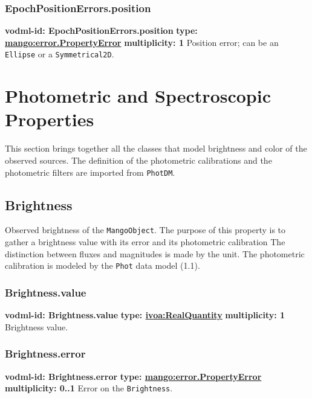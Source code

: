     \subsubsection{EpochPositionErrors.position}
    \textbf{vodml-id: EpochPositionErrors.position} \newline
    \textbf{type: \hyperref[sect:error.PropertyError]{mango:error.PropertyError}} \newline
    \textbf{multiplicity: 1} \newline
    Position error; can be an \texttt{Ellipse} or a \texttt{Symmetrical2D}.

\section{Photometric and Spectroscopic Properties}
This section brings together all the classes that model
brightness and color of the observed sources.
The definition of the photometric calibrations and the 
photometric filters are imported from \texttt{PhotDM}. 
  \subsection{Brightness}
    \label{sect:Brightness}
    Observed brightness of the \texttt{MangoObject}. The purpose of this property is to gather a brightness value with its error and its photometric calibration The distinction between fluxes and magnitudes is made by the unit. The photometric calibration is modeled by the \texttt{Phot} data model (1.1).

    \subsubsection{Brightness.value}
    \textbf{vodml-id: Brightness.value} \newline
    \textbf{type: \hyperref[sect:ivoa]{ivoa:RealQuantity}} \newline
    \textbf{multiplicity: 1} \newline
    Brightness value.

    \subsubsection{Brightness.error}
    \textbf{vodml-id: Brightness.error} \newline
    \textbf{type: \hyperref[sect:error.PropertyError]{mango:error.PropertyError}} \newline
    \textbf{multiplicity: 0..1} \newline
    Error on the \texttt{Brightness}.

